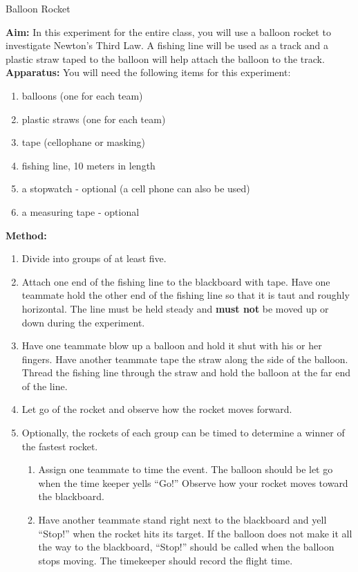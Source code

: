 \begin{g_experiment}{Balloon Rocket}{
\textbf{Aim: } In this experiment for the entire class, you will use a balloon rocket to investigate Newton's Third Law. A fishing line will be used as a track and a plastic straw taped to the balloon will help attach the balloon to the track.\\
\textbf{Apparatus: } You will need the following items for this experiment:
\begin{enumerate}
\item{balloons (one for each team)}
\item{plastic straws (one for each team)}
\item{tape (cellophane or masking)}
\item{fishing line, 10 meters in length}
\item{a stopwatch - optional (a cell phone can also be used)}
\item{a measuring tape - optional}
\end{enumerate}
\textbf{Method: }
\begin{enumerate}
\item Divide into groups of at least five.
\item Attach one end of the fishing line to the blackboard with tape. Have one teammate hold the other end of the fishing line so that it is taut and roughly horizontal. The line must be held steady and \textbf{must not} be moved up or down during the experiment.
\item Have one teammate blow up a balloon and hold it shut with his or her fingers. Have another teammate tape the straw along the side of the balloon. Thread the fishing line through the straw and hold the balloon at the far end of the line.
\item Let go of the rocket and observe how the rocket moves forward.
\item Optionally, the rockets of each group can be timed to determine a winner of the fastest rocket.
\begin{enumerate}
\item Assign one teammate to time the event. The balloon should be let go when the time keeper yells ``Go!'' Observe how your rocket moves toward the blackboard.
\item Have another teammate stand right next to the blackboard and yell ``Stop!'' when the rocket hits its target. If the balloon does not make it all the way to the blackboard, ``Stop!'' should be called when the balloon stops moving. The timekeeper should record the flight time.

\end{enumerate}
\end{enumerate}}
\end{g_experiment}
